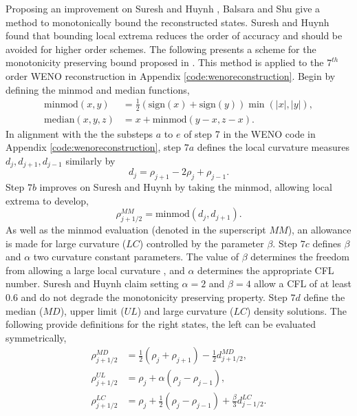 	Proposing an improvement on Suresh and Huynh \cite{Suresh97}, Balsara and Shu \cite{BalsaraShu00} give a method to monotonically bound the reconstructed states. Suresh and Huynh \cite{Suresh97} found that bounding local extrema reduces the order of accuracy and should be avoided for higher order schemes. The following presents a scheme for the monotonicity preserving bound proposed in \cite{BalsaraShu00}. This method is applied to the $7^{th}$ order WENO reconstruction in Appendix \ref{code:wenoreconstruction}. Begin by defining the minmod and median functions,
	\begin{align}	
		\mathrm{minmod}(x,y)&=\frac{1}{2}\left(\mathrm{sign}(x)+\mathrm{sign}(y)\right)\min\left(|x|,|y|\right),\\
		\mathrm{median}(x,y,z)&=x+\mathrm{minmod}(y-x,z-x).
	\end{align}
	In alignment with the the substeps $a$ to $e$ of step 7 in the WENO code in Appendix \ref{code:wenoreconstruction}, step $7a$ defines the local curvature measures $d_j,d_{j+1},d_{j-1}$ similarly by
	\begin{equation}
		d_j=\rho_{j+1}-2\rho_{j}+\rho_{j-1}.
	\end{equation}
	Step $7b$ improves on Suresh and Huynh \cite{Suresh97} by taking the minmod, allowing local extrema to develop,
	\begin{equation}
		\rho_{j+1/2}^{MM}=\mathrm{minmod}(d_j,d_{j+1}).
	\end{equation}
	As well as the minmod evaluation (denoted in the superscript $MM$), an allowance is made for large curvature ($LC$) controlled by the parameter $\beta$. Step $7c$ defines $\beta$ and $\alpha$ two curvature constant parameters. The value of $\beta$ determines the freedom from allowing a large local curvature , and $\alpha$ determines the appropriate CFL number. Suresh and Huynh \cite{Suresh97} claim setting $\alpha=2$ and $\beta=4$ allow a CFL of at least 0.6 and do not degrade the monotonicity preserving property. Step $7d$ define the median ($MD$), upper limit ($UL$) and large curvature ($LC$) density solutions. The following provide definitions for the right states, the left can be evaluated symmetrically,
	\begin{align}
		\rho_{j+1/2}^{MD}&=\frac{1}{2}\left(\rho_j+\rho_{j+1}\right)-\frac{1}{2}d_{j+1/2}^{MD},\\
		\rho_{j+1/2}^{UL}&=\rho_j+\alpha\left(\rho_j-\rho_{j-1}\right),\\
		\rho_{j+1/2}^{LC}&=\rho_j+\frac{1}{2}\left(\rho_j-\rho_{j-1}\right)+\frac{\beta}{3}d_{j-1/2}^{LC}.
	\end{align}
